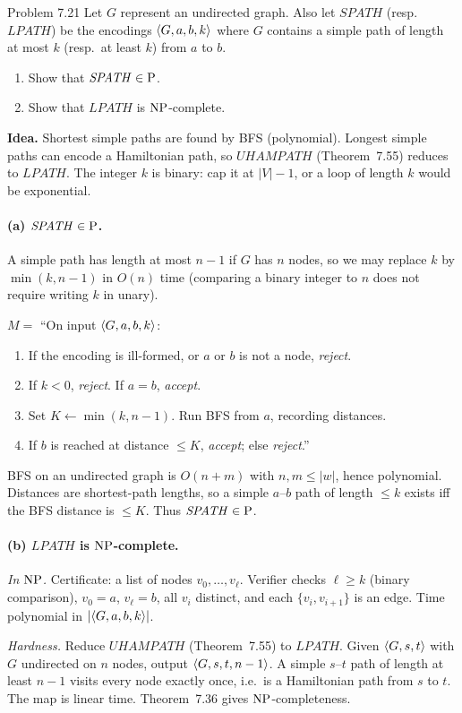 \begin{question}{Problem 7.21}
Let $G$ represent an undirected graph. Also let $\mathit{SPATH}$ (resp.\ $\mathit{LPATH}$) be the encodings $\langle G,a,b,k\rangle$ where $G$ contains a simple path of length at most $k$ (resp.\ at least $k$) from $a$ to $b$.
\begin{enumerate}[label=\alph*.]
\item Show that $\mathit{SPATH}\in\mathrm{P}$.
\item Show that $\mathit{LPATH}$ is $\mathrm{NP}$-complete.
\end{enumerate}
\end{question}
\begin{soln}
\textbf{Idea.} Shortest simple paths are found by BFS (polynomial). Longest simple paths can encode a Hamiltonian path, so $\mathit{UHAMPATH}$ (Theorem~7.55) reduces to $\mathit{LPATH}$. The integer $k$ is binary: cap it at $|V|-1$, or a loop of length $k$ would be exponential.

\paragraph{(a) $\mathit{SPATH}\in\mathrm{P}$.}
A simple path has length at most $n-1$ if $G$ has $n$ nodes, so we may replace $k$ by $\min(k,n-1)$ in $O(n)$ time (comparing a binary integer to $n$ does not require writing $k$ in unary).

$M=$ ``On input $\langle G,a,b,k\rangle$:
\begin{enumerate}
\item If the encoding is ill-formed, or $a$ or $b$ is not a node, \emph{reject}.
\item If $k<0$, \emph{reject}. If $a=b$, \emph{accept}.
\item Set $K\leftarrow\min(k,n-1)$. Run BFS from $a$, recording distances.
\item If $b$ is reached at distance $\le K$, \emph{accept}; else \emph{reject}.''
\end{enumerate}
BFS on an undirected graph is $O(n+m)$ with $n,m\le |w|$, hence polynomial. Distances are shortest-path lengths, so a simple $a$--$b$ path of length $\le k$ exists iff the BFS distance is $\le K$. Thus $\mathit{SPATH}\in\mathrm{P}$.

\paragraph{(b) $\mathit{LPATH}$ is $\mathrm{NP}$-complete.}
\emph{In $\mathrm{NP}$.} Certificate: a list of nodes $v_0,\dots,v_\ell$. Verifier checks $\ell\ge k$ (binary comparison), $v_0=a$, $v_\ell=b$, all $v_i$ distinct, and each $\{v_i,v_{i+1}\}$ is an edge. Time polynomial in $|\langle G,a,b,k\rangle|$.

\emph{Hardness.} Reduce $\mathit{UHAMPATH}$ (Theorem~7.55) to $\mathit{LPATH}$. Given $\langle G,s,t\rangle$ with $G$ undirected on $n$ nodes, output $\langle G,s,t,n-1\rangle$. A simple $s$--$t$ path of length at least $n-1$ visits every node exactly once, i.e.\ is a Hamiltonian path from $s$ to $t$. The map is linear time. Theorem~7.36 gives $\mathrm{NP}$-completeness.
\end{soln}

